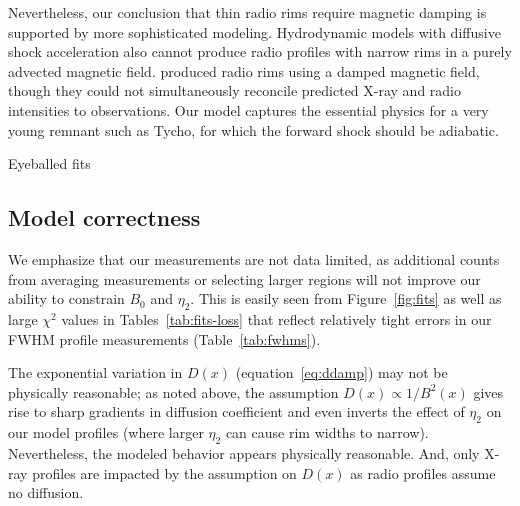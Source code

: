\documentclass[iop, apj, numberedappendix]{emulateapj}
\begin{document}
Nevertheless, our conclusion that thin radio rims require magnetic damping is
supported by more sophisticated modeling.  Hydrodynamic models with diffusive
shock acceleration \citep{cassam-chenai2007, slane2014} also cannot produce
radio profiles with narrow rims in a purely advected magnetic field.
\citet{cassam-chenai2007} produced radio rims using a damped magnetic field,
though they could not simultaneously reconcile predicted X-ray and radio
intensities to observations.  Our model captures the essential physics for a
very young remnant such as Tycho, for which the forward shock should be
adiabatic.


\begin{table}
    \scriptsize
    \centering
    \caption{Eyeballed fits
        \label{tab:fits-eyeball}}
    
\end{table}


\subsection{Model correctness}

We emphasize that our measurements are not data limited, as additional counts
from averaging measurements or selecting larger regions will not improve our
ability to constrain $B_0$ and $\eta_2$.  This is easily seen from
Figure~\ref{fig:fits} as well as large $\chi^2$ values in
Tables~\ref{tab:fits-loss} that reflect relatively tight errors in our FWHM
profile measurements (Table~\ref{tab:fwhms}).

The exponential variation in $D(x)$ (equation~\eqref{eq:ddamp}) may not be
physically reasonable; as noted above, the assumption $D(x)
\propto 1 / B^2(x)$ gives rise to sharp gradients in diffusion coefficient and
even inverts the effect of $\eta_2$ on our model profiles (where larger
$\eta_2$ can cause rim widths to narrow).  Nevertheless, the modeled behavior
appears physically reasonable.  And, only X-ray profiles are impacted by the
assumption on $D(x)$ as radio profiles assume no diffusion.

\end{document}
